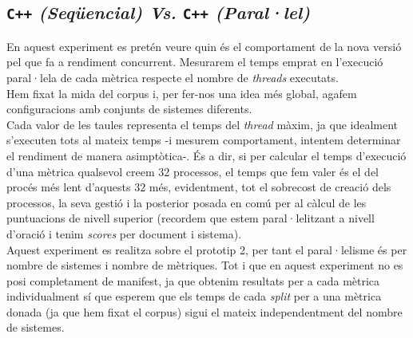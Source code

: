 \documentclass[11pt,a4paper]{article}
\begin{document}
\newpage
\subsection{\texttt{C++} \emph{(Seqüencial) Vs.} \texttt{C++} \emph{(Paral·lel)}}
En aquest experiment es pretén veure quin és el comportament de la nova versió pel que fa a rendiment concurrent. Mesurarem el temps emprat en l'execució paral·lela de cada mètrica respecte el nombre de \emph{threads} executats.
\\

Hem fixat la mida del corpus i, per fer-nos una idea més global, agafem configuracions amb conjunts de sistemes diferents.
\\

Cada  valor de les taules representa el temps del \textit{thread} màxim, ja que idealment s'executen tots al mateix temps -i mesurem comportament, intentem determinar el rendiment de manera asimptòtica-. És a dir, si per calcular el temps d'execució d'una mètrica qualsevol creem 32 processos, el temps que fem valer és el del procés més lent d'aquests 32 més, evidentment, tot el sobrecost de creació dels processos, la seva gestió i la posterior posada en comú per al càlcul de les puntuacions de nivell superior (recordem que estem paral·lelitzant a nivell d'oració i tenim \textit{scores} per document i sistema).
\\

Aquest experiment es realitza sobre el prototip 2, per tant el paral·lelisme és per nombre de sistemes i nombre de mètriques. Tot i que en aquest experiment no es posi completament de manifest, ja que obtenim resultats per a cada mètrica individualment sí que esperem que els temps de cada \textit{split} per a una mètrica donada (ja que hem fixat el corpus) sigui el mateix independentment del nombre de sistemes. 
\end{document}
